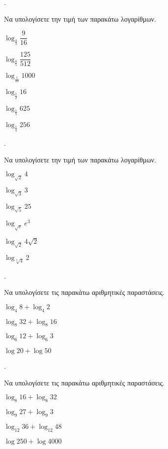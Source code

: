 \documentclass[11pt,a4paper,twocolumn]{article}
\newcounter{askhsh}
\newcommand{\askhsh}{{\large\theaskhsh.}\ \addtocounter{askhsh}{1}}
\begin{document}
\askhsh Να υπολογίσετε την τιμή των παρακάτω λογαρίθμων.
\begin{multicols}{2}
\begin{alist}
\item $ \log_{\frac{4}{3}}{\dfrac{9}{16}} $
\item $ \log_{\frac{8}{5}}{\dfrac{125}{512}} $
\item $ \log_{\frac{1}{10}}{1000} $
\item $ \log_{\frac{1}{2}}{16} $
\item $ \log_{\frac{1}{5}}{625} $
\item $ \log_{\frac{1}{4}}{256} $
\end{alist}
\end{multicols}
\askhsh Να υπολογίσετε την τιμή των παρακάτω λογαρίθμων.
\begin{multicols}{2}
\begin{alist}
\item $ \log_{\sqrt{2}}{4} $
\item $ \log_{\sqrt{3}}{3} $
\item $ \log_{\sqrt{5}}{25} $
\item $ \log_{\sqrt{e}}{e^3} $
\item $ \log_{\sqrt{2}}{4\sqrt{2}} $
\item $ \log_{\sqrt[3]{4}}{2} $
\end{alist}
\end{multicols}
\askhsh Να υπολογίσετε τις παρακάτω αριθμητικές παραστάσεις.
\begin{multicols}{2}
\begin{alist}
\item $ \log_{4}{8}+\log_{4}{2} $
\item $ \log_{8}{32}+\log_{8}{16} $
\item $ \log_{6}{12}+\log_{6}{3} $
\item $ \log{20}+\log{50} $
\end{alist}
\end{multicols}
\askhsh Να υπολογίσετε τις παρακάτω αριθμητικές παραστάσεις.
\begin{alist}
\item $ \log_{8}{16}+\log_{8}{32} $
\item $ \log_{9}{27}+\log_{9}{3} $
\item $ \log_{12}{36}+\log_{12}{48} $
\item $ \log{250}+\log{4000} $
\end{alist}
\end{document}
